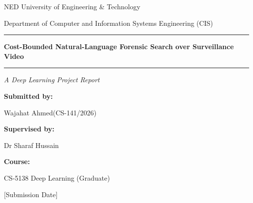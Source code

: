 \documentclass[11pt,a4paper]{article}
\newcommand{\University}{NED University of Engineering \& Technology}
\newcommand{\Department}{Department of Computer and Information Systems Engineering (CIS)}
\newcommand{\ProjectTitle}{Cost-Bounded Natural-Language Forensic Search over Surveillance Video}
\newcommand{\StudentName}{Wajahat Ahmed}
\newcommand{\StudentID}{CS-141/2026}
\newcommand{\Supervisor}{Dr Sharaf Hussain}
\newcommand{\SubmissionDate}{[Submission Date]}
\begin{document}
\begin{titlepage}
\centering
\vspace*{2.5cm}
{\Large \University\par}
\vspace{0.4cm}
{\large \Department\par}
\vspace{2.5cm}
\rule{\linewidth}{1.2pt}\par\vspace{0.4cm}
{\LARGE\bfseries \ProjectTitle\par}
\vspace{0.3cm}\rule{\linewidth}{1.2pt}\par
\vspace{1.5cm}
{\Large\itshape A Deep Learning Project Report\par}
\vspace{1.8cm}
{\bfseries Submitted by:\par}\vspace{0.2cm}
\StudentName \quad (\StudentID)\par
\vspace{0.6cm}
{\bfseries Supervised by:\par}\vspace{0.2cm}
\Supervisor\par
\vspace{0.6cm}
{\bfseries Course:\par}\vspace{0.2cm}
CS-5138 Deep Learning (Graduate)\par
\vfill
\SubmissionDate\par
\end{titlepage}

\setcounter{page}{1}
\end{document}

